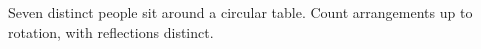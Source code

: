 Seven distinct people sit around a circular table. Count arrangements up to rotation, with reflections distinct.
